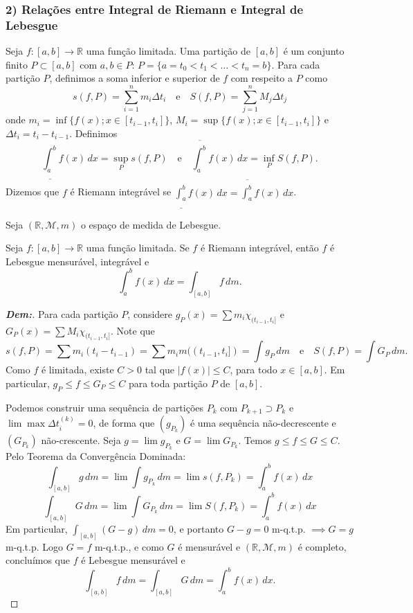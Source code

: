 \subsubsection*{2) Relações entre Integral de Riemann e Integral de Lebesgue}

Seja $f: [a,b] \rightarrow \mathbb{R}$ uma função limitada. Uma partição de $[a,b]$ é um conjunto finito $P \subset [a,b]$ com $a,b \in P$: $P = \{a = t_0 < t_1 < \dots < t_n = b\}$. Para cada partição $P$, definimos a soma inferior e superior de $f$ com respeito a $P$ como
$$ s(f,P) = \sum_{i=1}^n m_i \Delta t_i \quad \text{e} \quad S(f,P) = \sum_{j=1}^n M_j \Delta t_j $$
onde $m_i = \inf \{f(x) ; x \in [t_{i-1}, t_i]\}$, $M_i = \sup \{f(x) ; x \in [t_{i-1}, t_i]\}$ e $\Delta t_i = t_i - t_{i-1}$.
Definimos
$$ \underline{\int_a^b} f(x) \, dx = \sup_P s(f,P) \quad \text{e} \quad \overline{\int_a^b} f(x) \, dx = \inf_P S(f,P). $$
Dizemos que $f$ é Riemann integrável se $\underline{\int_a^b} f(x) \, dx = \overline{\int_a^b} f(x) \, dx$. 

Seja $(\mathbb{R}, \mathcal{M}, m)$ o espaço de medida de Lebesgue.

\begin{theorem*}{}
Seja $f: [a,b] \rightarrow \mathbb{R}$ uma função limitada. Se $f$ é Riemann integrável, então $f$ é Lebesgue mensurável, integrável e
$$ \int_a^b f(x) \, dx = \int_{[a,b]} f \, dm. $$
\end{theorem*}

\begin{proof}[\textbf{Dem:}]
Para cada partição $P$, considere $g_P(x) = \sum m_i \chi_{(t_{i-1}, t_i]}$ e $G_P(x) = \sum M_i \chi_{(t_{i-1}, t_i]}$. Note que
$$ s(f,P) = \sum m_i (t_i - t_{i-1}) = \sum m_i m((t_{i-1}, t_i]) = \int g_P \, dm \quad \text{e} \quad S(f,P) = \int G_P \, dm. $$
Como $f$ é limitada, existe $C > 0$ tal que $|f(x)| \le C$, para todo $x \in [a,b]$. Em particular, $g_P \le f \le G_P \le C$ para toda partição $P$ de $[a,b]$.

Podemos construir uma sequência de partições $P_k$ com $P_{k+1} \supset P_k$ e $\lim \max \Delta t_i^{(k)} = 0$, de forma que $(g_{P_k})$ é uma sequência não-decrescente e $(G_{P_k})$ não-crescente. Seja $g = \lim g_{P_k}$ e $G = \lim G_{P_k}$. Temos $g \le f \le G \le C$. 
Pelo Teorema da Convergência Dominada:
$$ \int_{[a,b]} g \, dm = \lim \int g_{P_k} \, dm = \lim s(f,P_k) = \int_a^b f(x) \, dx $$
$$ \int_{[a,b]} G \, dm = \lim \int G_{P_k} \, dm = \lim S(f,P_k) = \int_a^b f(x) \, dx $$
Em particular, $\int_{[a,b]} (G - g) \, dm = 0$, e portanto $G - g = 0$ m-q.t.p. $\implies G = g$ m-q.t.p. Logo $G = f$ m-q.t.p., e como $G$ é mensurável e $(\mathbb{R}, \mathcal{M}, m)$ é completo, concluímos que $f$ é Lebesgue mensurável e
$$ \int_{[a,b]} f \, dm = \int_{[a,b]} G \, dm = \int_a^b f(x) \, dx. $$
\end{proof}

